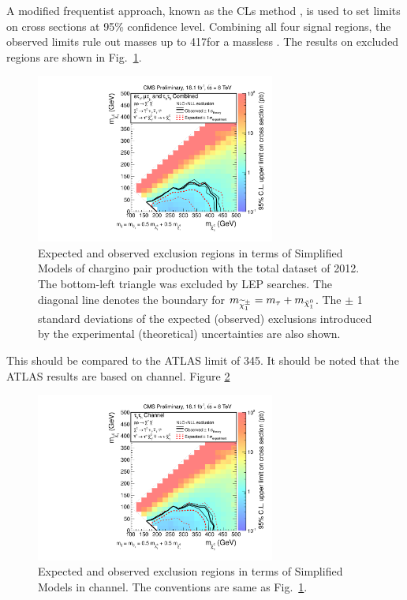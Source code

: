 A modified frequentist approach, known as the CLs method \cite{read:CLs}, is used to 
set limits on cross sections at 95\% confidence level.
Combining all four signal regions,
the observed limits rule out \chione  masses up to  417\GeV  for a massless \PSGczDo.  
The results on excluded regions are shown in Fig.~\ref{fig:limit_final}. 
\begin{linenomath}
\begin{figure}[!htb]
\centering
\includegraphics[width=0.7\textwidth,keepaspectratio=true]{StatisticsFig/Exclusion4Bins.pdf}
\caption{Expected and observed exclusion regions in terms of Simplified Models of
chargino pair production 
with the total dataset of 2012. The bottom-left triangle was excluded by LEP \sTau searches. 
The diagonal line denotes the boundary for $m_{\widetilde{\chi}^{\pm}_1} = m_{\tau} + m_{\tilde{\chi}^{0}_1}$.
The $\pm$ 1 standard deviations of the expected (observed) exclusions introduced by the experimental 
(theoretical) uncertainties are also shown.}
\label{fig:limit_final}
\end{figure}
\end{linenomath}
This should be compared to the ATLAS limit of 345\GeV \cite{Aad:2014yka}.
It should be noted that the ATLAS results are based on \tauTau channel. Figure 
\ref{fig:limit_tauTau} 
\begin{linenomath}
\begin{figure}[!htb]
\centering
\includegraphics[width=0.7\textwidth,keepaspectratio=true]{StatisticsFig/ExclusionTauTau2Bin.pdf}
\caption{Expected and observed exclusion regions in terms of Simplified Models
in \tauTau channel. The conventions are same as Fig.~\ref{fig:limit_final}.}
\label{fig:limit_tauTau}
\end{figure}
\end{linenomath}
